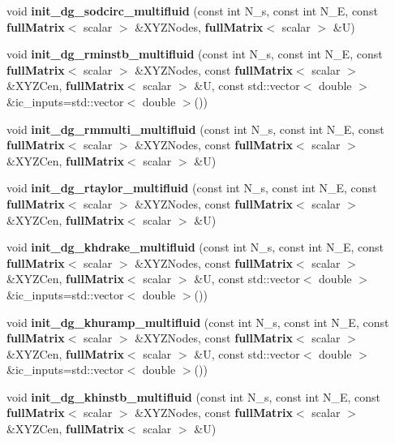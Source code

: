 \begin{DoxyCompactItemize}
\item 
void {\bfseries init\-\_\-dg\-\_\-sodcirc\-\_\-multifluid} (const int N\-\_\-s, const int N\-\_\-\-E, const {\bf full\-Matrix}$<$ scalar $>$ \&X\-Y\-Z\-Nodes, {\bf full\-Matrix}$<$ scalar $>$ \&U)\label{init__cond_8h_a7230f29512c4f783c3d3d71f2a29fee0}

\item 
void {\bfseries init\-\_\-dg\-\_\-rminstb\-\_\-multifluid} (const int N\-\_\-s, const int N\-\_\-\-E, const {\bf full\-Matrix}$<$ scalar $>$ \&X\-Y\-Z\-Nodes, const {\bf full\-Matrix}$<$ scalar $>$ \&X\-Y\-Z\-Cen, {\bf full\-Matrix}$<$ scalar $>$ \&U, const std\-::vector$<$ double $>$ \&ic\-\_\-inputs=std\-::vector$<$ double $>$())\label{init__cond_8h_a844b5446edfa1325418b17ef970529b9}

\item 
void {\bfseries init\-\_\-dg\-\_\-rmmulti\-\_\-multifluid} (const int N\-\_\-s, const int N\-\_\-\-E, const {\bf full\-Matrix}$<$ scalar $>$ \&X\-Y\-Z\-Nodes, const {\bf full\-Matrix}$<$ scalar $>$ \&X\-Y\-Z\-Cen, {\bf full\-Matrix}$<$ scalar $>$ \&U)\label{init__cond_8h_a7b4211d16331bc4d8459b472731fd546}

\item 
void {\bfseries init\-\_\-dg\-\_\-rtaylor\-\_\-multifluid} (const int N\-\_\-s, const int N\-\_\-\-E, const {\bf full\-Matrix}$<$ scalar $>$ \&X\-Y\-Z\-Nodes, const {\bf full\-Matrix}$<$ scalar $>$ \&X\-Y\-Z\-Cen, {\bf full\-Matrix}$<$ scalar $>$ \&U)\label{init__cond_8h_afc5b7edecc1e8295bba89fdd074d16e9}

\item 
void {\bfseries init\-\_\-dg\-\_\-khdrake\-\_\-multifluid} (const int N\-\_\-s, const int N\-\_\-\-E, const {\bf full\-Matrix}$<$ scalar $>$ \&X\-Y\-Z\-Nodes, const {\bf full\-Matrix}$<$ scalar $>$ \&X\-Y\-Z\-Cen, {\bf full\-Matrix}$<$ scalar $>$ \&U, const std\-::vector$<$ double $>$ \&ic\-\_\-inputs=std\-::vector$<$ double $>$())\label{init__cond_8h_a6fbd8681357b7a2cf9f062d623742d09}

\item 
void {\bfseries init\-\_\-dg\-\_\-khuramp\-\_\-multifluid} (const int N\-\_\-s, const int N\-\_\-\-E, const {\bf full\-Matrix}$<$ scalar $>$ \&X\-Y\-Z\-Nodes, const {\bf full\-Matrix}$<$ scalar $>$ \&X\-Y\-Z\-Cen, {\bf full\-Matrix}$<$ scalar $>$ \&U, const std\-::vector$<$ double $>$ \&ic\-\_\-inputs=std\-::vector$<$ double $>$())\label{init__cond_8h_ac2f3226c648f3a712b6056c8d045f1b1}

\item 
void {\bfseries init\-\_\-dg\-\_\-khinstb\-\_\-multifluid} (const int N\-\_\-s, const int N\-\_\-\-E, const {\bf full\-Matrix}$<$ scalar $>$ \&X\-Y\-Z\-Nodes, const {\bf full\-Matrix}$<$ scalar $>$ \&X\-Y\-Z\-Cen, {\bf full\-Matrix}$<$ scalar $>$ \&U)\label{init__cond_8h_ad596ca3bcfb7867c46d282db29ba0302}


\end{DoxyCompactItemize}
